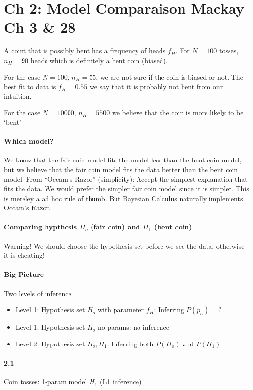 \documentclass[../main.tex]{subfiles}
\begin{document}
\section*{Ch 2: Model Comparaison Mackay Ch 3 \& 28}

A coint that is possibly bent has a frequency of heads $f_H$. For $N = 100$ tosses, $n_H = 90$ heads
which is definitely a bent coin (biased). 

For the case $N= 100$, $n_H = 55$, we are not sure if the coin is biased or not. The best fit to
data is $f_H = 0.55$ we say that it is probably not bent from our intuition.

For the case $N = 10000$, $n_H = 5500$ we believe that the coin is more likely to be `bent'

\paragraph{Which model?}
We know that the fair coin model fits the model less than the bent coin model, but we believe that
the fair coin model fits the data better than the bent coin model. From ``Occam's Razor'' 
(simplicity): Accept the simplest explanation that fits the data. We would prefer the simpler fair
coin model since it is simpler. This is mereley a ad hoc rule of thumb. But Bayesian Calculus
naturally implements Occam's Razor.

\paragraph{Comparing hypthesis $H_o$ (fair coin) and $H_1$ (bent coin)}

Warning! We should choose the hypothesis set before we see the data, otherwise it is cheating!

\paragraph{Big Picture} Two levels of inference
\begin{itemize}
    \item Level 1: Hypothesis set ${H_o}$ with parameter $f_H$: Inferring $P(p_a)=?$
    \item Level 1: Hypothesis set ${H_o}$ no params: no inference
    \item Level 2: Hypothesis set ${H_o, H_1}$: Inferring both $P(H_o)$ and $P(H_1)$
\end{itemize}

\paragraph*{2.1} Coin tosses: 1-param model $H_1$ (L1 inference)
\end{document}

